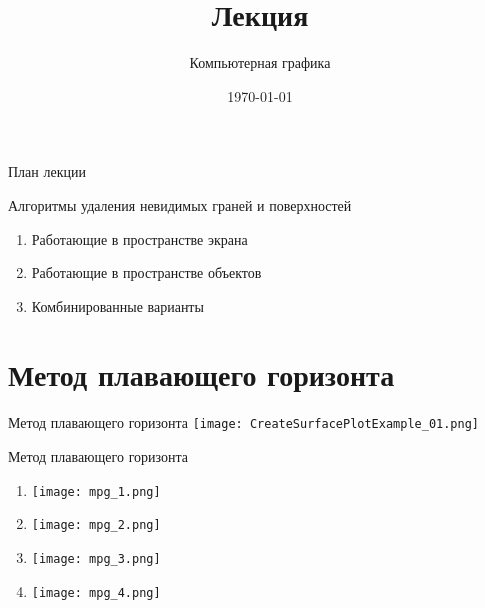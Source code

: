 \documentclass[10pt]{beamer}
\date{\today}
\title{Лекция \lecdni \\ \LectionTheme}
\subtitle{Компьютерная графика}
\begin{document}
 		 


\newcommand \abs[1] {\left| #1 \right|}

\everymath{\displaystyle}

    
    \QRFRAME	
	

	\frame{\maketitle}

	
	\begin{frame}{План лекции}
		\tableofcontents
	\end{frame}
	

	
	\begin{frame}{Алгоритмы удаления невидимых граней и поверхностей}
		
		\begin{enumerate}
			\item Работающие в пространстве экрана
			\item Работающие в пространстве объектов
			\item Комбинированные варианты
			
		\end{enumerate}
		
	\end{frame}
	
	
	
	\section{Метод плавающего горизонта}
	
	\begin{frame}{Метод плавающего горизонта}
		\centering%
		\texttt{[image: CreateSurfacePlotExample\_01.png]}
	\end{frame}
	
	\begin{frame}{Метод плавающего горизонта}
		{
			\begin{enumerate}
				\item \texttt{[image: mpg\_1.png]}
				\item \texttt{[image: mpg\_2.png]}
			\end{enumerate}
		}
		{
			\begin{enumerate}
				\setcounter{enumi}{2}
				\item \texttt{[image: mpg\_3.png]}
				\item \texttt{[image: mpg\_4.png]}
			\end{enumerate}
			
		}
		
	\end{frame}
	
\end{document}
